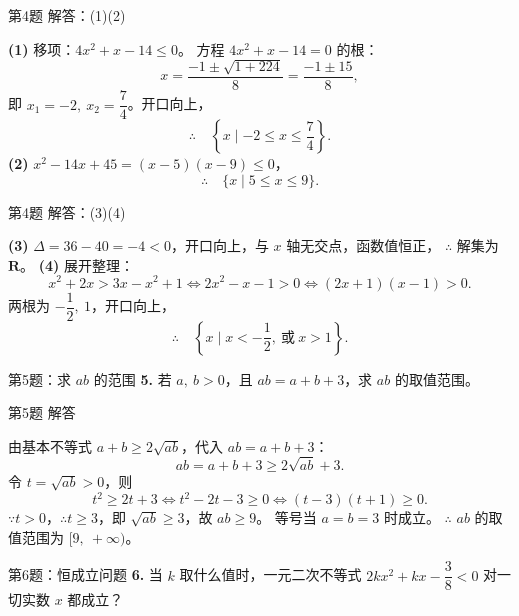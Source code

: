 \documentclass[10pt,aspectratio=169,serif]{beamer}
\begin{document}
\begin{frame}[t]{第4题 解答：(1)(2)}
\begin{tcolorbox}[colback=orange!10,colframe=orange,title=\textbf{解}]
\textbf{(1)} 移项：$4x^{2}+x-14\le 0$。
方程 $4x^{2}+x-14=0$ 的根：
\[
x=\frac{-1\pm\sqrt{1+224}}{8}=\frac{-1\pm 15}{8},
\]
即 $x_{1}=-2,\ x_{2}=\dfrac{7}{4}$。开口向上，
\[
\therefore\quad \left\{x\mid -2\le x\le \frac{7}{4}\right\}.
\]
\vspace{0.5em}
\textbf{(2)} $x^{2}-14x+45=(x-5)(x-9)\le 0$，
\[
\therefore\quad \{x\mid 5\le x\le 9\}.
\]
\end{tcolorbox}
\end{frame}

\begin{frame}[t]{第4题 解答：(3)(4)}
\begin{tcolorbox}[colback=orange!10,colframe=orange,title=\textbf{解}]
\textbf{(3)} $\Delta=36-40=-4<0$，开口向上，与 $x$ 轴无交点，函数值恒正，
$\therefore$ 解集为 $\mathbf{R}$。
\vspace{0.5em}
\textbf{(4)} 展开整理：
\[
x^{2}+2x>3x-x^{2}+1
\Longleftrightarrow 2x^{2}-x-1>0
\Longleftrightarrow (2x+1)(x-1)>0.
\]
两根为 $-\dfrac{1}{2},\ 1$，开口向上，
\[
\therefore\quad \left\{x\mid x<-\frac{1}{2},\ \text{或}\ x>1\right\}.
\]
\end{tcolorbox}
\end{frame}

\begin{frame}[t]{第5题：求 $ab$ 的范围}
\textbf{5.} 若 $a,\ b>0$，且 $ab=a+b+3$，求 $ab$ 的取值范围。
\end{frame}

\begin{frame}[t]{第5题 解答}
\begin{tcolorbox}[colback=orange!10,colframe=orange,title=\textbf{解}]
由基本不等式 $a+b\ge 2\sqrt{ab}$，代入 $ab=a+b+3$：
\[
ab=a+b+3\ge 2\sqrt{ab}+3.
\]
令 $t=\sqrt{ab}>0$，则
\[
t^{2}\ge 2t+3
\Longleftrightarrow t^{2}-2t-3\ge 0
\Longleftrightarrow (t-3)(t+1)\ge 0.
\]
$\because t>0$，$\therefore t\ge 3$，即 $\sqrt{ab}\ge 3$，故 $ab\ge 9$。
等号当 $a=b=3$ 时成立。
\vspace{0.5em}
$\therefore$ $ab$ 的取值范围为 \alert{$[9,\ +\infty)$}。
\end{tcolorbox}
\end{frame}

\begin{frame}[t]{第6题：恒成立问题}
\textbf{6.} 当 $k$ 取什么值时，一元二次不等式 $2kx^{2}+kx-\dfrac{3}{8}<0$ 对一切实数 $x$ 都成立？
\end{frame}
\end{document}
